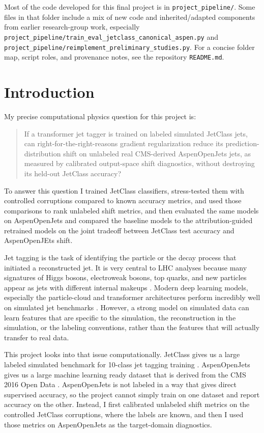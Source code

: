 \documentclass[11pt]{article}
\begin{document}
Most of the code developed for this final project is in \texttt{project\_pipeline/}. Some files in that folder include a mix of new code and inherited/adapted components from earlier research-group work, especially \texttt{project\_pipeline/train\_eval\_jetclass\_canonical\_aspen.py} and \texttt{project\_pipeline/reimplement\_preliminary\_studies.py}. For a concise folder map, script roles, and provenance notes, see the repository \texttt{README.md}.

\section{Introduction}
My precise computational physics question for this project is:
\begin{quote}
If a transformer jet tagger is trained on labeled simulated JetClass jets, can right-for-the-right-reasons gradient regularization reduce its prediction-distribution shift on unlabeled real CMS-derived AspenOpenJets jets, as measured by calibrated output-space shift diagnostics, without destroying its held-out JetClass accuracy?
\end{quote}

To answer this question I trained JetClass classifiers, stress-tested them with controlled corruptions compared to known accuracy metrics, and used those comparisons to rank unlabeled shift metrics, and then evaluated the same models on AspenOpenJets and compared the baseline models to the attribution-guided retrained models on the joint tradeoff between JetClass test accuracy and AspenOpenJEts shift.

Jet tagging is the task of identifying the particle or the decay process that initiated a reconstructed jet. It is very central to LHC analyses because many signatures of Higgs bosons, electroweak bosons, top quarks, and new particles appear as jets with different internal makeups \cite{larkoski2017jet,kogler2019jet}. Modern deep learning models, especially the particle-cloud and transformer architectures perform incredibly well on simulated jet benchmarks \cite{qu2022particle}. However, a strong model on simulated data can learn features that are specific to the simulation, the reconstruction in the simulation, or the labeling conventions, rather than the features that will actually transfer to real data.

This project looks into that issue computationally. JetClass gives us a large labeled simulated benchmark for 10-class jet tagging training \cite{qu2022particle}. AspenOpenJets gives us a large machine learning ready dataset that is derived from the CMS 2016 Open Data \cite{amram2025aspen}. AspenOpenJets is not labeled in a way that gives direct supervised accuracy, so the project cannot simply train on one dataset and report accuracy on the other. Instead, I first calibrated unlabeled shift metrics on the controlled JetClass corruptions, where the labels are known, and then I used those metrics on AspenOpenJets as the target-domain diagnostics.
\end{document}
